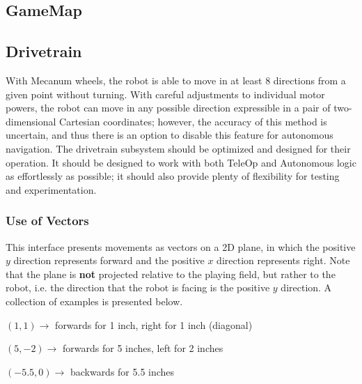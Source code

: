 \documentclass[letterpaper]{article}
\begin{document}
\subsection{GameMap}
\subsection{Drivetrain}
With Mecanum wheels, the robot is able to move in at least 8 directions from a given point without turning. With careful adjustments to individual motor powers, the robot can move in any possible direction expressible in a pair of two-dimensional Cartesian coordinates; however, the accuracy of this method is uncertain, and thus there is an option to disable this feature for autonomous navigation. The drivetrain subsystem should be optimized and designed for their operation. It should be designed to work with both TeleOp and Autonomous logic as effortlessly as possible; it should also provide plenty of flexibility for testing and experimentation.

\subsubsection{Use of Vectors}
This interface presents movements as vectors on a 2D plane, in which the positive $y$ direction represents forward and the positive $x$ direction represents right. Note that the plane is \textbf{not} projected relative to the playing field, but rather to the robot, i.e. the direction that the robot is facing is the positive $y$ direction. A collection of examples is presented below.
\begin{center}
	$(1, 1) \rightarrow$ forwards for 1 inch, right for 1 inch (diagonal)
	
	$(5, -2) \rightarrow$ forwards for 5 inches, left for 2 inches
	
	$(-5.5, 0) \rightarrow$ backwards for 5.5 inches
\end{center}
\end{document}
